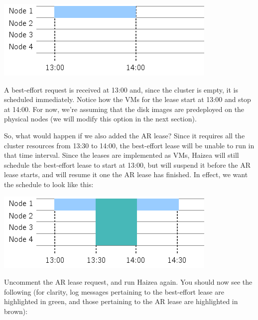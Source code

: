 \begin{center}
\includegraphics{images/quickstart_leasegraph2.png}
\end{center}

A best-effort request is received at 13:00 and, since the cluster is empty, it is scheduled immediately. Notice how the VMs for the lease start at 13:00 and stop at 14:00. For now, we're assuming that the disk images are predeployed on the physical nodes (we will modify this option in the next section).

So, what would happen if we also added the AR lease? Since it requires all the cluster resources from 13:30 to 14:00, the best-effort lease will be unable to run in that time interval. Since the leases are implemented as VMs, Haizea will still schedule the best-effort lease to start at 13:00, but will suspend it before the AR lease starts, and will resume it one the AR lease has finished. In effect, we want the schedule to look like this:

\begin{center}
\includegraphics{images/quickstart_leasegraph3.png}
\end{center}

Uncomment the AR lease request, and run Haizea again. You should now see the following (for clarity, log messages pertaining to the best-effort lease are highlighted in green, and those pertaining to the AR lease are highlighted in brown):

